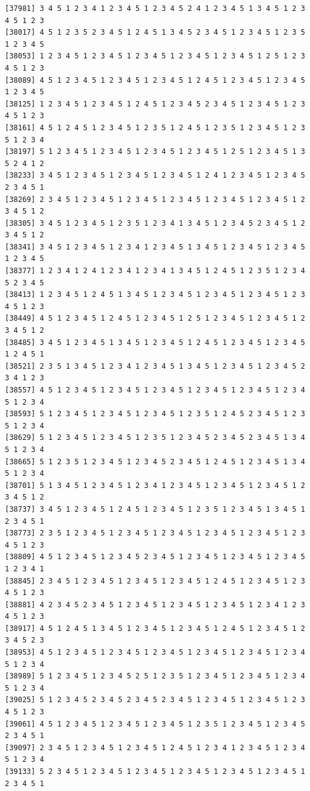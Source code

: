 \documentclass[
  11pt,
]{book}
\begin{document}
\begin{verbatim}
[37981] 3 4 5 1 2 3 4 1 2 3 4 5 1 2 3 4 5 2 4 1 2 3 4 5 1 3 4 5 1 2 3 4 5 1 2 3
[38017] 4 5 1 2 3 5 2 3 4 5 1 2 4 5 1 3 4 5 2 3 4 5 1 2 3 4 5 1 2 3 5 1 2 3 4 5
[38053] 1 2 3 4 5 1 2 3 4 5 1 2 3 4 5 1 2 3 4 5 1 2 3 4 5 1 2 5 1 2 3 4 5 1 2 3
[38089] 4 5 1 2 3 4 5 1 2 3 4 5 1 2 3 4 5 1 2 4 5 1 2 3 4 5 1 2 3 4 5 1 2 3 4 5
[38125] 1 2 3 4 5 1 2 3 4 5 1 2 4 5 1 2 3 4 5 2 3 4 5 1 2 3 4 5 1 2 3 4 5 1 2 3
[38161] 4 5 1 2 4 5 1 2 3 4 5 1 2 3 5 1 2 4 5 1 2 3 5 1 2 3 4 5 1 2 3 5 1 2 3 4
[38197] 5 1 2 3 4 5 1 2 3 4 5 1 2 3 4 5 1 2 3 4 5 1 2 5 1 2 3 4 5 1 3 5 2 4 1 2
[38233] 3 4 5 1 2 3 4 5 1 2 3 4 5 1 2 3 4 5 1 2 4 1 2 3 4 5 1 2 3 4 5 2 3 4 5 1
[38269] 2 3 4 5 1 2 3 4 5 1 2 3 4 5 1 2 3 4 5 1 2 3 4 5 1 2 3 4 5 1 2 3 4 5 1 2
[38305] 3 4 5 1 2 3 4 5 1 2 3 5 1 2 3 4 1 3 4 5 1 2 3 4 5 2 3 4 5 1 2 3 4 5 1 2
[38341] 3 4 5 1 2 3 4 5 1 2 3 4 1 2 3 4 5 1 3 4 5 1 2 3 4 5 1 2 3 4 5 1 2 3 4 5
[38377] 1 2 3 4 1 2 4 1 2 3 4 1 2 3 4 1 3 4 5 1 2 4 5 1 2 3 5 1 2 3 4 5 2 3 4 5
[38413] 1 2 3 4 5 1 2 4 5 1 3 4 5 1 2 3 4 5 1 2 3 4 5 1 2 3 4 5 1 2 3 4 5 1 2 3
[38449] 4 5 1 2 3 4 5 1 2 4 5 1 2 3 4 5 1 2 5 1 2 3 4 5 1 2 3 4 5 1 2 3 4 5 1 2
[38485] 3 4 5 1 2 3 4 5 1 3 4 5 1 2 3 4 5 1 2 4 5 1 2 3 4 5 1 2 3 4 5 1 2 4 5 1
[38521] 2 3 5 1 3 4 5 1 2 3 4 1 2 3 4 5 1 3 4 5 1 2 3 4 5 1 2 3 4 5 2 3 4 1 2 3
[38557] 4 5 1 2 3 4 5 1 2 3 4 5 1 2 3 4 5 1 2 3 4 5 1 2 3 4 5 1 2 3 4 5 1 2 3 4
[38593] 5 1 2 3 4 5 1 2 3 4 5 1 2 3 4 5 1 2 3 5 1 2 4 5 2 3 4 5 1 2 3 5 1 2 3 4
[38629] 5 1 2 3 4 5 1 2 3 4 5 1 2 3 5 1 2 3 4 5 2 3 4 5 2 3 4 5 1 3 4 5 1 2 3 4
[38665] 5 1 2 3 5 1 2 3 4 5 1 2 3 4 5 2 3 4 5 1 2 4 5 1 2 3 4 5 1 3 4 5 1 2 3 4
[38701] 5 1 3 4 5 1 2 3 4 5 1 2 3 4 1 2 3 4 5 1 2 3 4 5 1 2 3 4 5 1 2 3 4 5 1 2
[38737] 3 4 5 1 2 3 4 5 1 2 4 5 1 2 3 4 5 1 2 3 5 1 2 3 4 5 1 3 4 5 1 2 3 4 5 1
[38773] 2 3 5 1 2 3 4 5 1 2 3 4 5 1 2 3 4 5 1 2 3 4 5 1 2 3 4 5 1 2 3 4 5 1 2 3
[38809] 4 5 1 2 3 4 5 1 2 3 4 5 2 3 4 5 1 2 3 4 5 1 2 3 4 5 1 2 3 4 5 1 2 3 4 1
[38845] 2 3 4 5 1 2 3 4 5 1 2 3 4 5 1 2 3 4 5 1 2 4 5 1 2 3 4 5 1 2 3 4 5 1 2 3
[38881] 4 2 3 4 5 2 3 4 5 1 2 3 4 5 1 2 3 4 5 1 2 3 4 5 1 2 3 4 1 2 3 4 5 1 2 3
[38917] 4 5 1 2 4 5 1 3 4 5 1 2 3 4 5 1 2 3 4 5 1 2 4 5 1 2 3 4 5 1 2 3 4 5 2 3
[38953] 4 5 1 2 3 4 5 1 2 3 4 5 1 2 3 4 5 1 2 3 4 5 1 2 3 4 5 1 2 3 4 5 1 2 3 4
[38989] 5 1 2 3 4 5 1 2 3 4 5 2 5 1 2 3 5 1 2 3 4 5 1 2 3 4 5 1 2 3 4 5 1 2 3 4
[39025] 5 1 2 3 4 5 2 3 4 5 2 3 4 5 2 3 4 5 1 2 3 4 5 1 2 3 4 5 1 2 3 4 5 1 2 3
[39061] 4 5 1 2 3 4 5 1 2 3 4 5 1 2 3 4 5 1 2 3 5 1 2 3 4 5 1 2 3 4 5 2 3 4 5 1
[39097] 2 3 4 5 1 2 3 4 5 1 2 3 4 5 1 2 4 5 1 2 3 4 1 2 3 4 5 1 2 3 4 5 1 2 3 4
[39133] 5 2 3 4 5 1 2 3 4 5 1 2 3 4 5 1 2 3 4 5 1 2 3 4 5 1 2 3 4 5 1 2 3 4 5 1

\end{verbatim}
\end{document}
